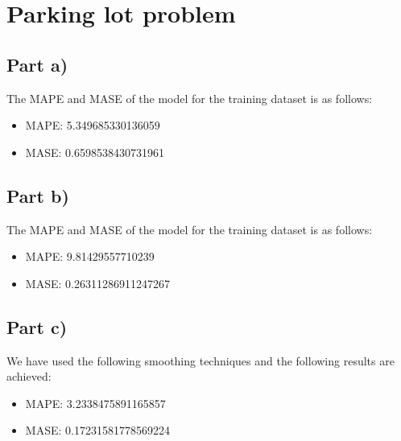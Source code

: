 \section{Parking lot problem}
\subsection{Part a)}
The MAPE and MASE of the model for the training dataset is as follows:
\begin{itemize}[noitemsep]
	\item MAPE:  5.349685330136059
	\item MASE:  0.6598538430731961
\end{itemize}


\subsection{Part b)}
The MAPE and MASE of the model for the training dataset is as follows:
\begin{itemize}[noitemsep]
	\item MAPE:  9.81429557710239
	\item MASE:  0.26311286911247267
\end{itemize}

\subsection{Part c)}
We have used the following smoothing techniques and the following results are achieved:
\begin{itemize}
	\item MAPE:  3.2338475891165857
	\item MASE:  0.17231581778569224
\end{itemize}
